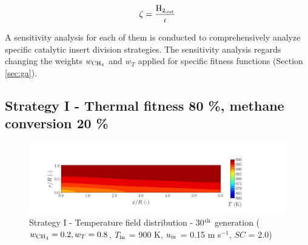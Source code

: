 \documentclass[preprint,12pt]{elsarticle}
\begin{document}
 \begin{equation}
 \label{eq:h2cat}
 \zeta = \frac{\rm{H_{2_{out}}}}{\iota}
  \end{equation}

A sensitivity analysis for each of them is conducted to comprehensively analyze specific catalytic insert division strategies. The sensitivity analysis regards changing the weights $w_{\rm{CH_4}}$ and $w_T$ applied for specific fitness functions (Section \ref{sec:ga}).

\subsection{Strategy I - Thermal fitness 80 \%, methane conversion 20 \%}
\label{subsec:S12080}

%

\begin{figure}[h!]
\centering
\includegraphics[width=150mm]{results/5/20C_80T/GEN30-TFIELD.png}
\caption{\label{fig:5R2080G30-TField} Strategy I - Temperature field distribution - 30$^{\rm{th}}$ generation ($w_{\rm{CH_4}} = 0.2, w_T = 0.8$, $T_{\rm{in}}$ = 900 K, $u_{\rm{in}}$ = 0.15 m s$^{-1}$, $SC$ = 2.0)}
\end{figure}


%
\end{document}
